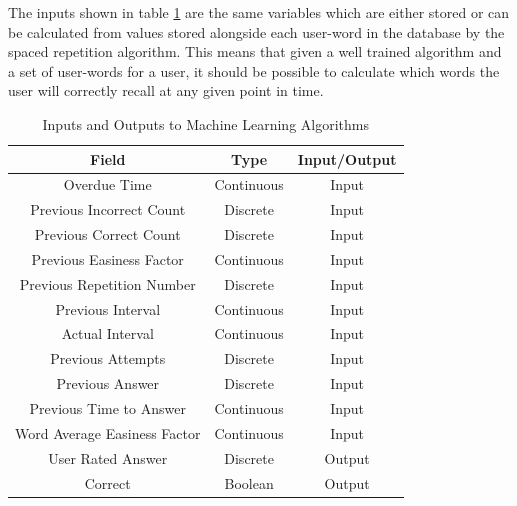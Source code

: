 The inputs shown in table \ref{tbl_inputoutputs} are the same variables which are
either stored or can be calculated from values stored alongside each user-word in
the database by the spaced repetition algorithm. This means that given a well
trained algorithm and a set of user-words for a user, it should be possible to
calculate which words the user will correctly recall at any given point in time.

\begin{table}[h!]
\caption{Inputs and Outputs to Machine Learning Algorithms}
\label{tbl_inputoutputs}
\begin{tabular}{|c|c|c|}
\hline
Field & Type & Input/Output \\
\hline
Overdue Time & Continuous & Input \\
Previous Incorrect Count & Discrete & Input \\
Previous Correct Count & Discrete & Input \\
Previous Easiness Factor & Continuous & Input \\
Previous Repetition Number & Discrete & Input \\
Previous Interval & Continuous & Input \\
Actual Interval & Continuous & Input \\
Previous Attempts & Discrete & Input \\
Previous Answer & Discrete & Input \\
Previous Time to Answer & Continuous & Input \\
Word Average Easiness Factor & Continuous & Input \\
\hline
User Rated Answer & Discrete & Output \\
Correct & Boolean & Output \\
\hline
\end{tabular}
\end{table}
